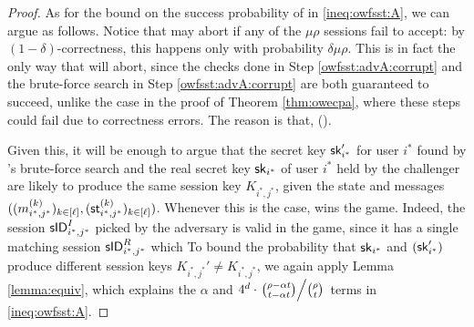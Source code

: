 \begin{proof}
  As for the bound on the success probability of \advA in \eqref{ineq:owfsst:A},
  we can argue as follows.
  Notice that \advA may abort if any of the \(\mu \rho\) sessions fail to accept:
  by \((1-\delta)\)-correctness, this happens only with probability \(\delta \mu \rho\).
  This is in fact the only way that \advA will abort,
  since the checks done in Step \ref{owfsst:advA:corrupt}
  and the brute-force search in Step \ref{owfsst:advA:corrupt}
  are both guaranteed to succeed,
  unlike the case in the proof of Theorem \ref{thm:owecpa},
  where these steps could fail due to correctness errors.
  The reason is that, ().

  Given this, it will be enough to argue that the secret key \(\mathsf{sk}_{i^{*}}'\) for user \(i^{*}\)
  found by \advA's brute-force search and
  the real secret key \(\mathsf{sk}_{i^{*}}\) of user \(i^{*}\) held by the challenger
  are likely to produce the same session key \(K_{i^{*},j^{*}}\),
  given the state and messages \(((m_{i^{*},j^{*}}^{(k)})_{k \in [\ell]},(\mathsf{st}_{i^{*},j^{*}}^{(k)})_{k \in [\ell]})\).
  Whenever this is the case, \advA wins the \OwFSst game.
  Indeed, the session \(\mathsf{sID}_{i^{*},j^{*}}^{I}\) picked by the adversary is valid in the \OwFSst game,
  since it has a single matching session \(\mathsf{sID}_{i^{*},j^{*}}^{R}\) which 
  To bound the probability that
  \(\mathsf{sk}_{i^{*}}\) and \((\mathsf{sk}_{i^{*}}')\) produce different session keys \(K_{i^{*},j^{*}}' \ne K_{i^{*},j^{*}}\),
  we again apply Lemma \ref{lemma:equiv},
  which explains the \(\alpha\) and
  \(
    4^{d} \cdot \left. \binom{\rho - \alpha t}{t - \alpha t} \middle/ \binom{\rho}{t} \right.
  \)
  terms in \eqref{ineq:owfsst:A}.
\end{proof}



